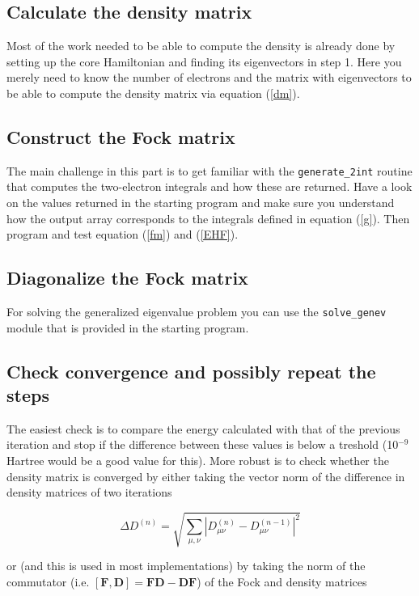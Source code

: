 \documentclass[11pt, bibliography=totoc]{scrartcl}
\begin{document}
\subsection{Calculate the density matrix}
Most of the work needed to be able to compute the density is already done by setting up the core Hamiltonian and finding its eigenvectors in step 1. Here you merely need to know the number of electrons and the matrix with eigenvectors to be able to compute the density matrix via equation (\ref{dm}).

\subsection{Construct the Fock matrix}
The main challenge in this part is to get familiar with the \texttt{generate\_2int} routine that computes the two-electron integrals and how these are returned. Have a look on the values returned in the starting program and make sure you understand how the output array corresponds to the integrals defined in equation (\ref{g}). Then program and test equation (\ref{fm}) and (\ref{EHF}).

\subsection{Diagonalize the Fock matrix}
For solving the generalized eigenvalue problem you can use the \texttt{solve\_genev} module that is provided in the starting program. 

\subsection{Check convergence and possibly repeat the steps}
The easiest check is to compare the energy calculated with that of the previous iteration and stop if the difference between these values is below a treshold (10$^{-9}$ Hartree would be a good value for this). More robust is to check whether the density matrix is converged by either taking the vector norm of the difference in density matrices of two iterations 

\begin{equation} \label{Dconv} 
 \Delta D^{(n)} = \sqrt{\sum_{\mu,\nu} \left| D^{(n)}_{\mu\nu} - D^{(n-1)}_{\mu\nu} \right|^2}
 \end{equation}

or (and this is used in most implementations) by taking the norm of the commutator (i.e. $\left[ \mathbf{F}, \mathbf{D} \right] = \mathbf{F}\mathbf{D} - \mathbf{D}\mathbf{F}$) of the Fock and density matrices 
\end{document}
